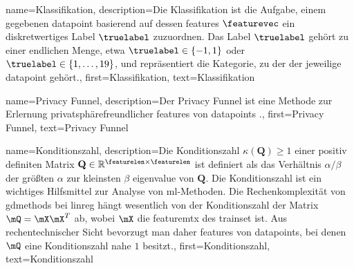 {{
{
	name={Klassifikation},
	description={Die  Klassifikation ist die Aufgabe, einem gegebenen 
		\gls{datapoint} basierend auf dessen \glspl{feature} $\featurevec$ ein diskretwertiges Label $\truelabel$ 
		zuzuordnen. Das Label $\truelabel$ gehört zu einer endlichen Menge, etwa 
		$\truelabel \in \{-1,1\}$ oder $\truelabel \in \{1,\ldots,19\}$, und repräsentiert die Kategorie, 
		zu der der jeweilige \gls{datapoint} gehört.},
	first={Klassifikation}, text={Klassifikation}

}

{
	name={Privacy Funnel},
	description={Der  Privacy Funnel ist eine Methode zur Erlernung 
		privatsphärefreundlicher \gls{feature}s von \gls{datapoint}s \cite{PrivacyFunnel}.},
	first={Privacy Funnel}, text={Privacy Funnel}
}

{
	name={Konditionszahl},
	description={Die  Konditionszahl $\kappa(\mathbf{Q}) \geq 1$ einer positiv definiten 
		Matrix $\mathbf{Q} \in \mathbb{R}^{\featurelen \times \featurelen}$ ist definiert als das Verhältnis 
		$\alpha / \beta$ der größten $\alpha$ zur kleinsten $\beta$ \gls{eigenvalue} von $\mathbf{Q}$. 
		Die Konditionszahl ist ein wichtiges Hilfsmittel zur Analyse von \gls{ml}-Methoden. 
		Die Rechenkomplexität von \gls{gdmethods} bei \gls{linreg} hängt wesentlich von der 
		Konditionszahl der Matrix $\mQ = \mX \mX^{T}$ ab, wobei $\mX$ die \gls{featuremtx} 
		des \gls{trainset} ist. Aus rechentechnischer Sicht bevorzugt man daher \gls{feature}s 
		von \gls{datapoint}s, bei denen $\mQ$ eine Konditionszahl nahe $1$ besitzt.},
	first={Konditionszahl}, text={Konditionszahl}
}

}}
